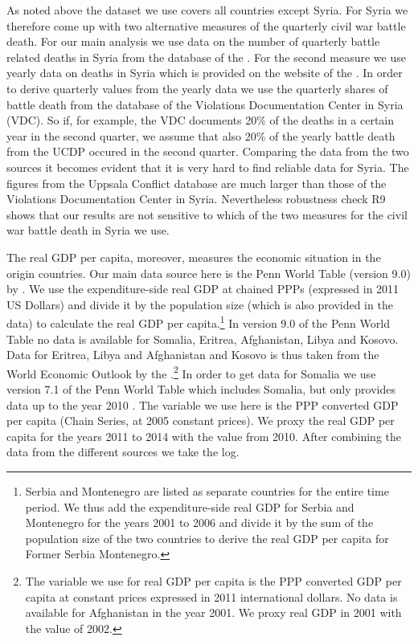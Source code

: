 \documentclass[11pt,a4paper]{scrartcl}
\begin{document}
As noted above the dataset we use covers all countries except Syria. For Syria we therefore come up with two alternative measures of the quarterly civil war battle death. For our main analysis we use data on the number of quarterly battle related deaths in Syria from the database of the \textcite{VDC2017}. For the second measure we use yearly data on deaths in Syria which is provided on the website of the  \textcite{UppsalaSyria2017}. In order to derive quarterly values from the yearly data we use the quarterly shares of battle death from the database of the Violations Documentation Center in Syria (VDC). So if, for example, the VDC documents 20\% of the deaths in a certain year in the second quarter, we assume that also 20\% of the yearly battle death from the UCDP occured in the second quarter. Comparing the data from the two sources it becomes evident that it is very hard to find reliable data for Syria. The figures from the Uppsala Conflict database are much larger than those of the Violations Documentation Center in Syria. Nevertheless robustness check R9 shows that our results are not sensitive to which of the two measures for the civil war battle death in Syria we use. 

The real GDP per capita, moreover, measures the economic situation in the origin countries. Our main data source here is the Penn World Table (version 9.0) by \textcite{PWT2015}. We use the expenditure-side real GDP at chained PPPs (expressed in 2011 US Dollars) and divide it by the population size (which is also provided in the data) to calculate the real GDP per capita.\footnote{Serbia and Montenegro are listed as separate countries for the entire time period. We thus add the expenditure-side real GDP for Serbia and Montenegro for the years 2001 to 2006 and divide it by the sum of the population size of the two countries to derive the real GDP per capita for Former Serbia Montenegro.} In version 9.0 of the Penn World Table no data is available for Somalia, Eritrea, Afghanistan, Libya and Kosovo. Data for Eritrea, Libya and Afghanistan and Kosovo is thus taken from the World Economic Outlook by the \textcite{IMF2017}.\footnote{The variable we use for real GDP per capita is the PPP converted GDP per capita at constant prices expressed in 2011 international dollars. No data is available for Afghanistan in the year 2001. We proxy real GDP in 2001 with the value of 2002.} In order to get data for Somalia we use version 7.1 of the Penn World Table which includes Somalia, but only provides data up to the year 2010 \parencite{PWT2012}. The variable we use here is the PPP converted GDP per capita (Chain Series, at 2005 constant prices). We proxy the real GDP per capita for the years 2011 to 2014 with the value from 2010. After combining the data from the different sources we take the log. 
\end{document}
